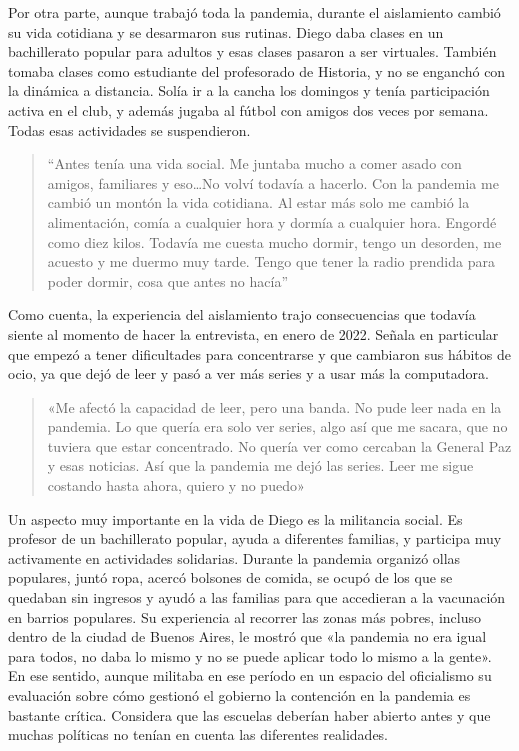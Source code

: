 Por otra parte, aunque trabajó toda la pandemia, durante el aislamiento cambió su vida cotidiana y se desarmaron sus rutinas. Diego daba clases en un bachillerato popular para adultos y esas clases pasaron a ser virtuales. También tomaba clases como estudiante del profesorado de Historia, y no se enganchó con la dinámica a distancia. Solía ir a la cancha los domingos y tenía participación activa en el club, y además jugaba al fútbol con amigos dos veces por semana. Todas esas actividades se suspendieron.

\begin{quote}
``Antes tenía una vida social. Me juntaba mucho a comer asado con amigos, familiares y eso\ldots No volví todavía a hacerlo. Con la pandemia me cambió un montón la vida cotidiana. Al estar más solo me cambió la alimentación, comía a cualquier hora y dormía a cualquier hora. Engordé como diez kilos. Todavía me cuesta mucho dormir, tengo un desorden, me acuesto y me duermo muy tarde. Tengo que tener la radio prendida para poder dormir, cosa que antes no hacía''
\end{quote}

Como cuenta, la experiencia del aislamiento trajo consecuencias que todavía siente al momento de hacer la entrevista, en enero de 2022. Señala en particular que empezó a tener dificultades para concentrarse y que cambiaron sus hábitos de ocio, ya que dejó de leer y pasó a ver más series y a usar más la computadora.

\begin{quote}
«Me afectó la capacidad de leer, pero una banda. No pude leer nada en la pandemia. Lo que quería era solo ver series, algo así que me sacara, que no tuviera que estar concentrado. No quería ver como cercaban la General Paz y esas noticias. Así que la pandemia me dejó las series. Leer me sigue costando hasta ahora, quiero y no puedo»
\end{quote}

Un aspecto muy importante en la vida de Diego es la militancia social. Es profesor de un bachillerato popular, ayuda a diferentes familias, y participa muy activamente en actividades solidarias. Durante la pandemia organizó ollas populares, juntó ropa, acercó bolsones de comida, se ocupó de los que se quedaban sin ingresos y ayudó a las familias para que accedieran a la vacunación en barrios populares. Su experiencia al recorrer las zonas más pobres, incluso dentro de la ciudad de Buenos Aires, le mostró que «la pandemia no era igual para todos, no daba lo mismo y no se puede aplicar todo lo mismo a la gente». En ese sentido, aunque militaba en ese período en un espacio del oficialismo su evaluación sobre cómo gestionó el gobierno la contención en la pandemia es bastante crítica. Considera que las escuelas deberían haber abierto antes y que muchas políticas no tenían en cuenta las diferentes realidades.

